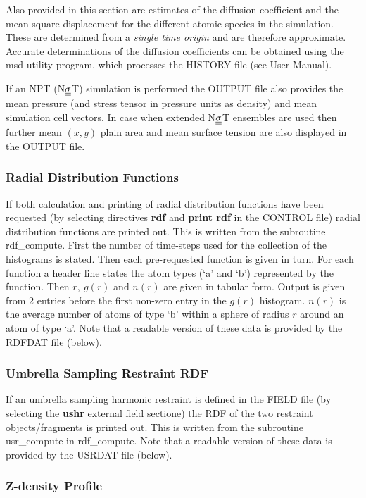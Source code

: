 Also provided in this section are estimates of the diffusion
coefficient and the mean square displacement for the different
atomic species in the simulation.  These are determined from a {\em
single time origin} and are therefore approximate.  Accurate
determinations of the diffusion coefficients can be obtained using
the {\sc msd} utility program, which processes the HISTORY file
(see \C User Manual).

If an NPT (N$\mbox{$\underline{\underline{\bf \sigma}}$}$T) simulation is performed the OUTPUT file
also provides the mean pressure (and stress tensor in pressure units
as density) and mean simulation cell vectors.  In case when extended
N$\mbox{$\underline{\underline{\bf \sigma}}$}$T ensembles are used then further mean $(x,y)$
plain area and mean surface tension are also displayed in the OUTPUT file.

\subsubsection{Radial Distribution Functions}

If both calculation and printing of radial distribution functions
have been requested (by selecting directives {\bf rdf} and {\bf
print rdf} in the CONTROL file) radial distribution functions are
printed out.  This is written from the subroutine {\sc
rdf\_compute}.  First the number of time-steps used for the
collection of the histograms is stated.  Then each pre-requested
function is given in turn.  For each function a header line states
the atom types (`a' and `b') represented by the function.  Then
$r,~g(r)$ and $n(r)$ are given in tabular form.  Output is given
from 2 entries before the first non-zero entry in the $g(r)$
histogram.  $n(r)$ is the average number of atoms of type `b' within
a sphere of radius $r$ around an atom of type `a'.
Note that a readable version of these data is provided by the
RDFDAT file (below).

\subsubsection{Umbrella Sampling Restraint RDF}

If an umbrella sampling harmonic restraint is defined in the FIELD file
(by selecting the {\bf ushr} external field sectione) the RDF of the
two restraint objects/fragments is printed out.  This is written from
the subroutine {\sc usr\_compute} in {\sc rdf\_compute}.
Note that a readable version of these data is provided by the
USRDAT file (below).

\subsubsection{Z-density Profile}

